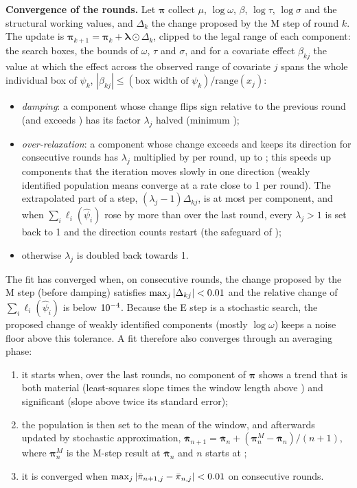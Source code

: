 \documentclass[11pt]{article}
\begin{document}
\textbf{Convergence of the rounds.} Let $\boldsymbol\pi$ collect $\mu$, $\log\omega$, $\beta$, $\log\tau$, $\log\sigma$ and the structural working values, and $\Delta_k$ the change proposed by the M step of round $k$. The update is $\boldsymbol\pi_{k+1}=\boldsymbol\pi_k+\boldsymbol\lambda\odot\Delta_k$, clipped to the legal range of each component: the search boxes, the bounds of $\omega$, $\tau$ and $\sigma$, and for a covariate effect $\beta_{kj}$ the value at which the effect across the observed range of covariate $j$ spans the whole individual box of $\psi_k$, $|\beta_{kj}|\le(\text{box width of }\psi_k)/\text{range}(x_j)$:
\begin{itemize}
\item \emph{damping}: a component whose change flips sign relative to the previous round (and exceeds \valOutTolPar) has its factor $\lambda_j$ halved (minimum \valOutDampMin);
\item \emph{over-relaxation}: a component whose change exceeds \valOutRelaxMin{} and keeps its direction for \valOutRelaxAfter{} consecutive rounds has $\lambda_j$ multiplied by \valOutRelaxGrow{} per round, up to \valOutLamMax{} \citep{salakhutdinov2003}; this speeds up components that the iteration moves slowly in one direction (weakly identified population means converge at a rate close to 1 per round). The extrapolated part of a step, $(\lambda_j-1)\Delta_{kj}$, is at most \valOutMaxExtra{} per component, and when $\sum_i\ell_i(\hat\psi_i)$ rose by more than \valOutResetRise{} over the last round, every $\lambda_j>1$ is set back to 1 and the direction counts restart (the safeguard of \citealt{salakhutdinov2003});
\item otherwise $\lambda_j$ is doubled back towards 1.
\end{itemize}
The fit has converged when, on \valOutNok{} consecutive rounds, the change proposed by the M step (before damping) satisfies $\max_j|\Delta_{kj}|<0.01$ and the relative change of $\sum_i\ell_i(\hat\psi_i)$ is below $10^{-4}$. Because the E step is a stochastic search, the proposed change of weakly identified components (mostly $\log\omega$) keeps a noise floor above this tolerance. A fit therefore also converges through an averaging phase:
\begin{enumerate}
\item it starts when, over the last \valOutWindow{} rounds, no component of $\boldsymbol\pi$ shows a trend that is both material (least-squares slope times the window length above \valOutTolDrift) and significant (slope above twice its standard error);
\item the population is then set to the mean of the window, and afterwards updated by stochastic approximation, $\bar{\boldsymbol\pi}_{n+1}=\bar{\boldsymbol\pi}_n+(\boldsymbol\pi^{M}_{n}-\bar{\boldsymbol\pi}_n)/(n+1)$, where $\boldsymbol\pi^{M}_{n}$ is the M-step result at $\bar{\boldsymbol\pi}_n$ and $n$ starts at \valOutWindow{} \citep{delyon1999};
\item it is converged when $\max_j|\bar\pi_{n+1,j}-\bar\pi_{n,j}|<0.01$ on \valOutNok{} consecutive rounds.
\end{enumerate}
\end{document}
